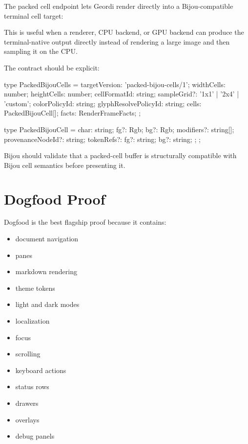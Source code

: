 The packed cell endpoint lets Geordi render directly into a Bijou-compatible terminal cell target:



This is useful when a renderer, CPU backend, or GPU backend can produce the terminal-native output directly instead of rendering a large image and then sampling it on the CPU.

The contract should be explicit:

\begin{CodeBlock}
type PackedBijouCells = {
  targetVersion: 'packed-bijou-cells/1';
  widthCells: number;
  heightCells: number;
  cellFormatId: string;
  sampleGrid?: '1x1' | '2x4' | 'custom';
  colorPolicyId: string;
  glyphResolvePolicyId: string;
  cells: PackedBijouCell[];
  facts: RenderFrameFacts;
};

type PackedBijouCell = {
  char: string;
  fg?: Rgb;
  bg?: Rgb;
  modifiers?: string[];
  provenanceNodeId?: string;
  tokenRefs?: {
    fg?: string;
    bg?: string;
  };
};
\end{CodeBlock}

Bijou should validate that a packed-cell buffer is structurally compatible with Bijou cell semantics before presenting it.

\section{Dogfood Proof}\label{record-139-dogfood-proof}

Dogfood is the best flagship proof because it contains:

\begin{itemize}
\tightlist
\item
  document navigation
\item
  panes
\item
  markdown rendering
\item
  theme tokens
\item
  light and dark modes
\item
  localization
\item
  focus
\item
  scrolling
\item
  keyboard actions
\item
  status rows
\item
  drawers
\item
  overlays
\item
  debug panels
\end{itemize}

